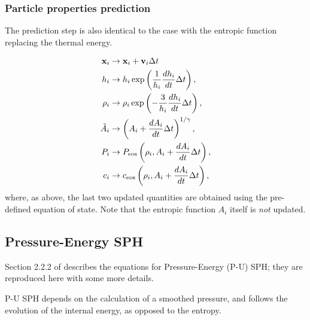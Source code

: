 \subsubsection{Particle properties prediction}

The prediction step is also identical to the \MinimalSPH case with the
entropic function replacing the thermal energy.

\begin{align}
  \vec{x}_i &\rightarrow \vec{x}_i + \vec{v}_i \Delta t  \label{eq:sph:pe:drift_x} \\
  h_i &\rightarrow h_i \exp\left(\frac{1}{h_i} \frac{dh_i}{dt}
  \Delta t\right), \label{eq:sph:pe:drift_h}\\
  \rho_i &\rightarrow \rho_i \exp\left(-\frac{3}{h_i} \frac{dh_i}{dt}
  \Delta t\right), \label{eq:sph:pe:drift_rho} \\
  \tilde A_i &\rightarrow \left(A_i + \frac{dA_i}{dt}
  \Delta t\right)^{1/\gamma} \label{eq:sph:pe:drift_A_tilde}, \\
  P_i &\rightarrow P_{\rm eos}\left(\rho_i, A_i + \frac{dA_i}{dt} \Delta t\right), \label{eq:sph:pe:drift_P}\\
  c_i &\rightarrow c_{\rm eos}\left(\rho_i, A_i + \frac{dA_i}{dt}
  \Delta t\right) \label{eq:sph:pe:drift_c}, 
\end{align}
where, as above, the last two updated quantities are obtained using
the pre-defined equation of state. Note that the entropic function $A_i$
itself is \emph{not} updated.

\subsection{Pressure-Energy SPH}
\label{sec:sph:pu}

Section 2.2.2 of \cite{Hopkins2013} describes the equations for Pressure-Energy
(P-U) SPH; they are reproduced here with some more details.

P-U SPH depends on the calculation of a smoothed pressure, and follows the
evolution of the internal energy, as opposed to the entropy.

